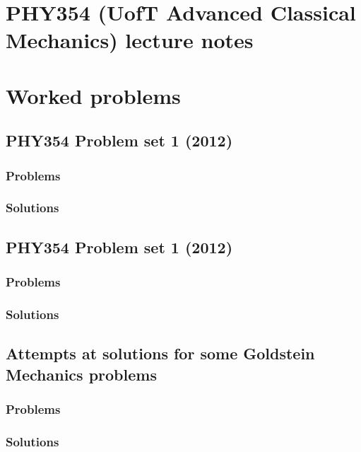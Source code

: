 \part{PHY354 (UofT Advanced Classical Mechanics) lecture notes}
   
   
   
   

\part{Worked problems}
   \chapter{PHY354 Problem set 1 (2012)}
      \section{Problems}
         
      \section{Solutions}
         \shipoutAnswer
   \chapter{PHY354 Problem set 1 (2012)}
      \section{Problems}
         
      \section{Solutions}
         \shipoutAnswer
   \chapter{Attempts at solutions for some Goldstein Mechanics problems}
      \section{Problems}
          
      \section{Solutions}
         \shipoutAnswer
